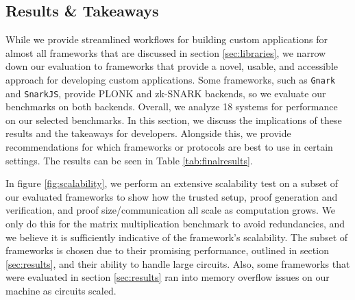 \subsection{Results \& Takeaways} 
\label{sec:results}
While we provide streamlined workflows for building custom applications for almost all frameworks that are discussed in section \ref{sec:libraries}, we narrow down our evaluation to frameworks that provide a novel, usable, and accessible approach for developing custom applications. Some frameworks, such as \texttt{Gnark} and \texttt{SnarkJS}, provide PLONK and zk-SNARK backends, so we evaluate our benchmarks on both backends. Overall, we analyze 18 systems for performance on our selected benchmarks. In this section, we discuss the implications of these results and the takeaways for developers. Alongside this, we provide recommendations for which frameworks or protocols are best to use in certain settings. The results can be seen in Table \ref{tab:finalresults}.

\begin{figure*}[t]
\centering
{}
\hspace{1em}
{}
\hspace{1em}
{}
\hspace{1em}
{}
\caption{Analysis of scalability of select frameworks over matrix multiplication benchmarks spanning $8\times8$ matrix size, resulting in 64 constraints, up to $128\times128$ matrix size, resulting in 2,097,152 constraints.}
\label{fig:scalability}
\end{figure*}

In figure \ref{fig:scalability}, we perform an extensive scalability test on a subset of our evaluated frameworks to show how the trusted setup, proof generation and verification, and proof size/communication all scale as computation grows. We only do this for the matrix multiplication benchmark to avoid redundancies, and we believe it is sufficiently indicative of the framework's scalability. The subset of frameworks is chosen due to their promising performance, outlined in section \ref{sec:results}, and their ability to handle large circuits. Also,  some frameworks that were evaluated in section \ref{sec:results} ran into memory overflow issues on our machine as circuits scaled.

